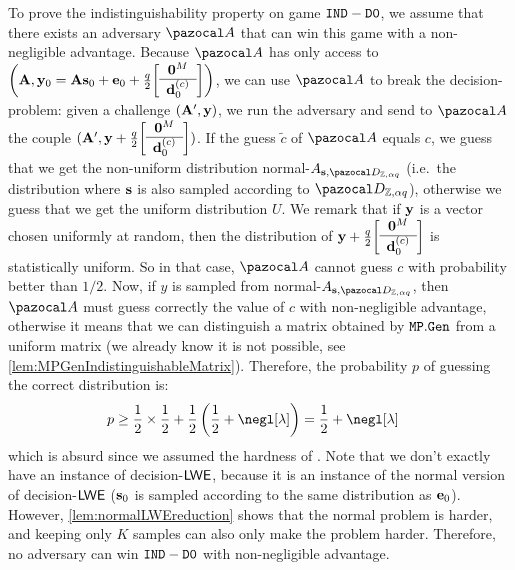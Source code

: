 {\begin{proofE}
    To prove the indistinguishability property on game $ {\tt IND-D0} $, we assume that there exists an adversary $\cA$ that can win this game with a non-negligible advantage. Because $\cA$ has only access to $\left(\vect{A}, \vect{y}_0 = \vect{A} \vect{s}_0 + \vect{e}_0 + \frac{q}{2} \SmallBlockMatrix{\vect{0}^M}{\vect{d}_0^{(c)}}\right)$, we can use $\cA$ to break the decision-\LWE{} problem: given a challenge $(\mathbf{A}', \mathbf{y})$, we run the adversary and send to $\cA$ the couple $(\vect{A}', \vect{y}+ \frac{q}{2} \SmallBlockMatrix{\vect{0}^M}{\vect{d}_0^{(c)}})$. If the guess $\tilde{c}$ of $\cA$ equals $c$, we guess that we get the non-uniform distribution normal-$A_{\vect{s},\cD_{\Z,\alpha q}}$ (i.e.\ the distribution where $\mathbf{s}$ is also sampled according to $\cD_{\Z,\alpha q}$), otherwise we guess that we get the uniform distribution $U$. We remark that if $\mathbf{y}$ is a vector chosen uniformly at random, then the distribution of $\vect{y}+ \frac{q}{2} \SmallBlockMatrix{\vect{0}^M}{\vect{d}_0^{(c)}}$ is statistically uniform. So in that case, $\cA$ cannot guess $c$ with probability better than $1/2$. Now, if $y$ is sampled from normal-$A_{\vect{s},\cD_{\Z,\alpha q}}$, then $\cA$ must guess correctly the value of $c$ with non-negligible advantage, otherwise it means that we can distinguish a matrix obtained by ${\tt MP.Gen}$ from a uniform matrix (we already know it is not possible, see \cref{lem:MPGenIndistinguishableMatrix}). Therefore, the probability $p$ of guessing the correct distribution is:
    \begin{align}
      p &\geq \frac{1}{2} \times \frac{1}{2} + \frac{1}{2} \left(\frac{1}{2} + \negl[\lambda]\right) = \frac{1}{2} + \negl[\lambda]
    \end{align}
    which is absurd since we assumed the hardness of \LWE{}. Note that we don't exactly have an instance of decision-$\textsf{LWE}$, because it is an instance of the normal version of decision-$\textsf{LWE}$ ($\mathbf{s}_0$ is sampled according to the same distribution as $\mathbf{e}_0$). However, \cref{lem:normalLWEreduction} shows that the normal problem is harder, and keeping only $K$ samples can also only make the problem harder. Therefore, no adversary can win $ {\tt IND-D0} $ with non-negligible advantage.


\end{proofE}}
